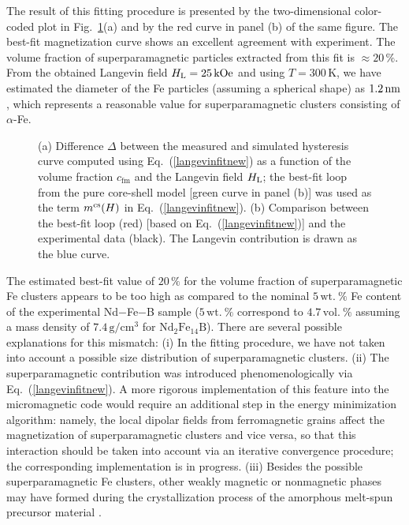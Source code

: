 \documentclass[prm,twocolumn,showkeys,preprintnumbers,amsmath,amssymb,superscriptaddress,aps,10pt]{revtex4-1}
\begin{document}
The result of this fitting procedure is presented by the two-dimensional color-coded plot in Fig.~\ref{superparaMdfine}(a) and by the red curve in panel (b) of the same figure. The best-fit magnetization curve shows an excellent agreement with experiment. The volume fraction of superparamagnetic particles extracted from this fit is $\approx 20 \, \%$. From the obtained Langevin field $H_{\rm L} = 25 \, \rm{kOe}$ and using $T = 300 \, \mathrm{K}$, we have estimated the diameter of the Fe particles (assuming a spherical shape) as $1.2 \, \rm{nm}$, which represents a reasonable value for superparamagnetic clusters consisting of $\alpha$-Fe. 

\begin{figure}[htb]
\centering
{}
\caption{(a) Difference $\Delta$ between the measured and simulated hysteresis curve computed using Eq.~(\ref{langevinfitnew}) as a function of the volume fraction $c_{\mathrm{fm}}$ and the Langevin field $H_{\rm L}$; the best-fit loop from the pure core-shell model [green curve in panel (b)] was used as the term $m^{\rm cs}(H)$ in Eq.~(\ref{langevinfitnew}). (b) Comparison between the best-fit loop (red) [based on Eq.~(\ref{langevinfitnew})] and the experimental data (black). The Langevin contribution is drawn as the blue curve.}
\label{superparaMdfine}
\end{figure}

The estimated best-fit value of $20 \, \%$ for the volume fraction of superparamagnetic Fe clusters appears to be too high as compared to the nominal $5 \, \mathrm{wt.~\%}$ Fe content of the experimental Nd$-$Fe$-$B sample ($5 \, \mathrm{wt.~\%}$ correspond to $4.7 \, \mathrm{vol.~\%}$ assuming a mass density of $7.4 \, \mathrm{g/cm^3}$ for $\mathrm{Nd}_2\mathrm{Fe}_{14}\mathrm{B}$). There are several possible explanations for this mismatch: (i) In the fitting procedure, we have not taken into account a possible size distribution of superparamagnetic clusters. (ii) The superparamagnetic contribution was introduced phenomenologically via Eq.~(\ref{langevinfitnew}). A more rigorous implementation of this feature into the micromagnetic code would require an additional step in the energy minimization algorithm: namely, the local dipolar fields from ferromagnetic grains affect the magnetization of superparamagnetic clusters and vice versa, so that this interaction should be taken into account via an iterative convergence procedure; the corresponding implementation is in progress. (iii) Besides the possible superparamagnetic Fe clusters, other weakly magnetic or nonmagnetic phases may have formed during the crystallization process of the amorphous melt-spun precursor material \cite{suzukism2000}.
\end{document}

